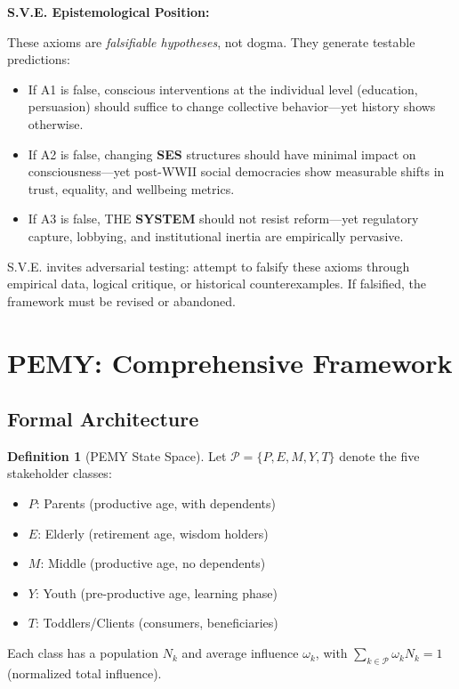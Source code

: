 \documentclass[11pt,a4paper]{article}
\newcommand{\SYSTEM}{\textbf{SYSTEM}}
\newcommand{\SES}{\textbf{SES}}
\theoremstyle{definition}
\newtheorem{definition}{Definition}[section]
\theoremstyle{remark}
\begin{document}
\begin{mdframed}[backgroundcolor=sveteal!5,linecolor=sveteal,linewidth=2pt]
\textbf{S.V.E. Epistemological Position:}

These axioms are \emph{falsifiable hypotheses}, not dogma. They generate testable predictions:
\begin{itemize}[leftmargin=1.5em]
\item If A1 is false, conscious interventions at the individual level (education, persuasion) should suffice to change collective behavior---yet history shows otherwise.
\item If A2 is false, changing \SES{} structures should have minimal impact on consciousness---yet post-WWII social democracies show measurable shifts in trust, equality, and wellbeing metrics.
\item If A3 is false, THE \SYSTEM{} should not resist reform---yet regulatory capture, lobbying, and institutional inertia are empirically pervasive.
\end{itemize}

S.V.E. invites adversarial testing: attempt to falsify these axioms through empirical data, logical critique, or historical counterexamples. If falsified, the framework must be revised or abandoned.
\end{mdframed}

\section{PEMY: Comprehensive Framework}
\label{app:pemy_comprehensive}

\subsection{Formal Architecture}
\label{app:pemy_formal}

\begin{definition}[PEMY State Space]
Let $\mathcal{P} = \{P, E, M, Y, T\}$ denote the five stakeholder classes:
\begin{itemize}[leftmargin=1.5em]
    \item $P$: Parents (productive age, with dependents)
    \item $E$: Elderly (retirement age, wisdom holders)
    \item $M$: Middle (productive age, no dependents)
    \item $Y$: Youth (pre-productive age, learning phase)
    \item $T$: Toddlers/Clients (consumers, beneficiaries)
\end{itemize}
Each class has a population $N_k$ and average influence $\omega_k$, with $\sum_{k \in \mathcal{P}} \omega_k N_k = 1$ (normalized total influence).
\end{definition}
\end{document}
